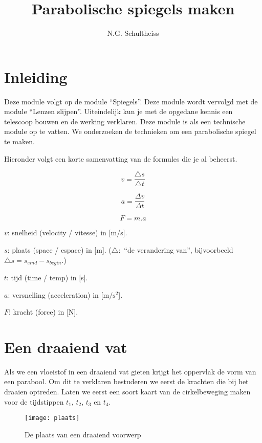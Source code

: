 



\title{Parabolische spiegels maken}
\author{N.G. Schultheiss}
\date{}

\maketitle
\thispagestyle{firststyle}

\section{Inleiding}

Deze module volgt op de module ``Spiegels''. Deze module wordt vervolgd
met de module ``Lenzen slijpen''. Uiteindelijk kun je met de opgedane
kennis een telescoop bouwen en de werking verklaren. Deze module is
als een technische module op te vatten. We onderzoeken de technieken
om een parabolische spiegel te maken.

Hieronder volgt een korte samenvatting van de formules die je al beheerst.

\[
v=\frac{\triangle s}{\triangle t}
\]


\[
a=\frac{\Delta v}{\Delta t}
\]


\[
F=m.a
\]


$v$: snelheid (velocity / vitesse) in {[}m/s{]}.

$s$: plaats (space / espace) in {[}m{]}. ($\triangle:$ ``de verandering
van'', bijvoorbeeld $\triangle s=s_{eind}-s_{begin}$.)

$t$: tijd (time / temp) in {[}s{]}.

$a$: versnelling (acceleration) in {[}$\mathrm{m/s^{2}}${]}.

$F$: kracht (force) in {[}N{]}.


\section{Een draaiend vat}

Als we een vloeistof in een draaiend vat gieten krijgt het oppervlak
de vorm van een parabool. Om dit te verklaren bestuderen we eerst
de krachten die bij het draaien optreden. Laten we eerst een soort
kaart van de cirkelbeweging maken voor de tijdstippen $t_{1}$, $t_{2}$,
$t_{3}$ en $t_{4}$.

\begin{figure}[H]
\noindent \begin{centering}
\texttt{[image: plaats]}
\par\end{centering}

\caption{De plaats van een draaiend voorwerp}
\end{figure}


